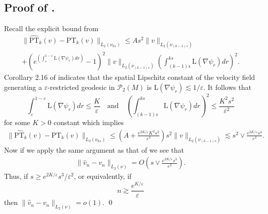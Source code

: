 \documentclass[11pt]{article}
\newcommand{\man}{M}
\begin{document}
\subsection{Proof of .} \label{sec: proof of parallel transport approx entire geodesic clipped}
Recall the explicit bound from 
\begin{multline*}
    \|\widehat{\text{PT}}_k(v) - \text{PT}_k(v)\|_{L_2(\nu_{ks})} \leq As^2\|v\|_{L_2(\nu_{(k-1)s})}\\
    + \left(e^{\left(\int_\varepsilon^{1-\varepsilon}\text{L}(\nabla \psi_r)dr\right)}  - 1\right)^2\|v\|_{L_2(\nu_{(k-1)s})}\left(\int_{(k-1)s}^{ks}\text{L}(\nabla\psi_r)dr\right)^2.
\end{multline*}
Corollary 2.16 of \citet{gigli2012second} indicates that the spatial Lipschitz constant of the velocity field generating a $\varepsilon$-restricted geodesic in $\mathcal{P}_2(\man)$ is $\text{L}(\nabla \psi_r) \lesssim 1/\varepsilon$. It follows that 
\[\int_{\varepsilon}^{1-\varepsilon}\text{L}(\nabla \psi_r)dr \leq \frac{K}{\varepsilon} \quad \text{and} \quad \left(\int_{(k-1)s}^{ks}\text{L}(\nabla\psi_r)dr\right)^2 \leq \frac{K^2s^2}{\varepsilon^2}\]
for some $K > 0$ constant which implies 
\begin{align*}
    \|\widehat{\text{PT}}_k(v) - \text{PT}_k(v)\|_{L_2(\nu_{ks})} \leq \left(A +\frac{e^{2K/\varepsilon}K^2s^2}{\varepsilon^2}\right)s^2\|v\|_{L_2(\nu_{(k-1)s})} \lesssim  s^2 \vee\frac{e^{2K/\varepsilon}s^4}{\varepsilon^2}.
\end{align*}
Now if we apply the same argument as that of  we see that 
\begin{align*}
    \|\hat{v}_n - v_n\|_{L_2(\nu)} = O\left(s \vee\frac{e^{2K/\varepsilon}s^3}{\varepsilon^2}\right).
\end{align*}
Thus, if  $s \geq e^{2K/\varepsilon}s^3/\varepsilon^2$, or equivalently, if 
\[n \gtrsim \frac{e^{K/\varepsilon}}{\varepsilon}\]
then $\|\hat v_n - v_n\|_{L_2(\nu)} = o(1).$ \qed{}
\\
\end{document}
